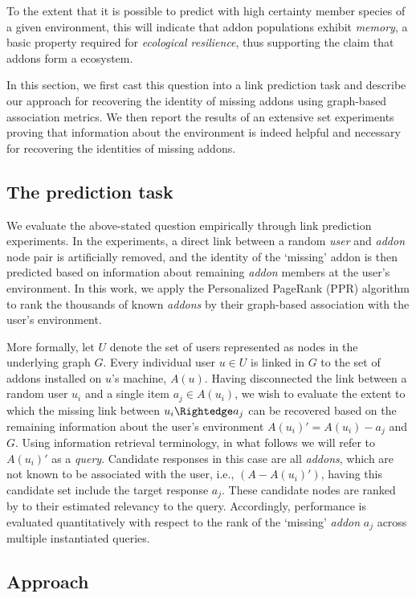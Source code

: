 \documentclass[ijoc,nonblindrev]{informs3} %
\numberwithin{equation}{subsection}
\begin{document}
To the extent that it is possible to predict with high certainty member species of a given environment, this will indicate that addon populations exhibit {\it memory}, a basic property required for {\it ecological resilience}, thus supporting the claim that addons form a ecosystem. 

In this section, we first cast this question into a link prediction task and describe our approach for recovering the identity of missing addons using graph-based association metrics. We then report the results of an extensive set experiments proving that information about the environment is indeed helpful and necessary for recovering the identities of missing addons. 

\subsection{The prediction task}
\label{sec:task}

We evaluate the above-stated question empirically through link prediction experiments. In the experiments, a direct link between a random {\it user} and {\it addon} node pair is artificially removed, and the identity of the `missing' addon is then predicted based on information about remaining {\it addon} members at the user's environment. In this work, we apply the Personalized
PageRank (PPR) algorithm to rank the thousands of known {\it addons} by their graph-based association with the user's environment. 

More formally, let $U$ denote the set of users represented as nodes in the underlying graph $G$. Every individual user $u\in U$ is linked in $G$ to the set of addons installed on $u$'s machine, $A(u)$. Having disconnected the link between a random user $u_i$ and a single item $a_j \in A(u_i)$, we wish to evaluate the extent to which the missing link between $u_i \Rightedge a_j$ can be recovered based on the remaining information about the user's environment $A(u_i)'=A(u_i)-a_j$ and $G$. Using information retrieval terminology, in what follows we will refer to $A(u_i)'$ as a {\it query}. Candidate responses in this case are all {\it addons}, which are not known to be associated with the user, i.e., $(A-A(u_i)')$, having this candidate set include the target response $a_j$. These candidate nodes are ranked by to their estimated relevancy to the query. Accordingly, performance is evaluated quantitatively with respect to the rank of the `missing' {\it addon} $a_j$ across multiple instantiated queries. 

\subsection{Approach}
\label{sec:method}
\end{document}
